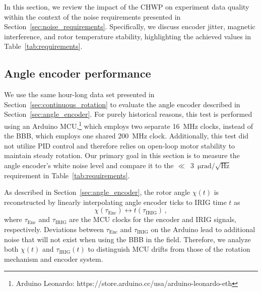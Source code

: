 In this section, we review the impact of the CHWP on experiment data quality within the context of the noise requirements presented in Section~\ref{sec:noise_requirements}. Specifically, we discuss encoder jitter, magnetic interference, and rotor temperature stability, highlighting the achieved values in Table~\ref{tab:requirements}.


\subsection{Angle encoder performance}
\label{sec:pb2b_chwp_evaluation_encoder_jitter}

We use the same hour-long data set presented in Section~\ref{sec:continuous_rotation} to evaluate the angle encoder described in Section~\ref{sec:angle_encoder}. For purely historical reasons, this test is performed using an Arduino MCU,\footnote{Arduino Leonardo: https://store.arduino.cc/usa/arduino-leonardo-eth} which employs two separate 16~MHz clocks, instead of the BBB, which employs one shared 200~MHz clock. Additionally, this test did not utilize PID control and therefore relies on open-loop motor stability to maintain steady rotation. Our primary goal in this section is to measure the angle encoder's white noise level and compare it to the $\ll$~$3$~$\mathrm{\mu rad / \sqrt{Hz}}$ requirement in Table~\ref{tab:requirements}.

As described in Section~\ref{sec:angle_encoder}, the rotor angle $\chi(t)$ is reconstructed by linearly interpolating angle encoder ticks to IRIG time $t$ as
\begin{equation}
    \chi(\tau_{\mathrm{Enc}}) \longleftrightarrow t(\tau_{\mathrm{IRIG}}) \, ,
    \label{eq:interpolation}
\end{equation}
where $\tau_{\mathrm{Enc}}$ and $\tau_{\mathrm{IRIG}}$ are the MCU clocks for the encoder and IRIG signals, respectively. Deviations between $\tau_{\mathrm{Enc}}$ and $\tau_{\mathrm{IRIG}}$ on the Arduino lead to additional noise that will not exist when using the BBB in the field. Therefore, we analyze both $\chi(t)$ and $\tau_{\mathrm{IRIG}}(t)$ to distinguish MCU drifts from those of the rotation mechanism and encoder system.

